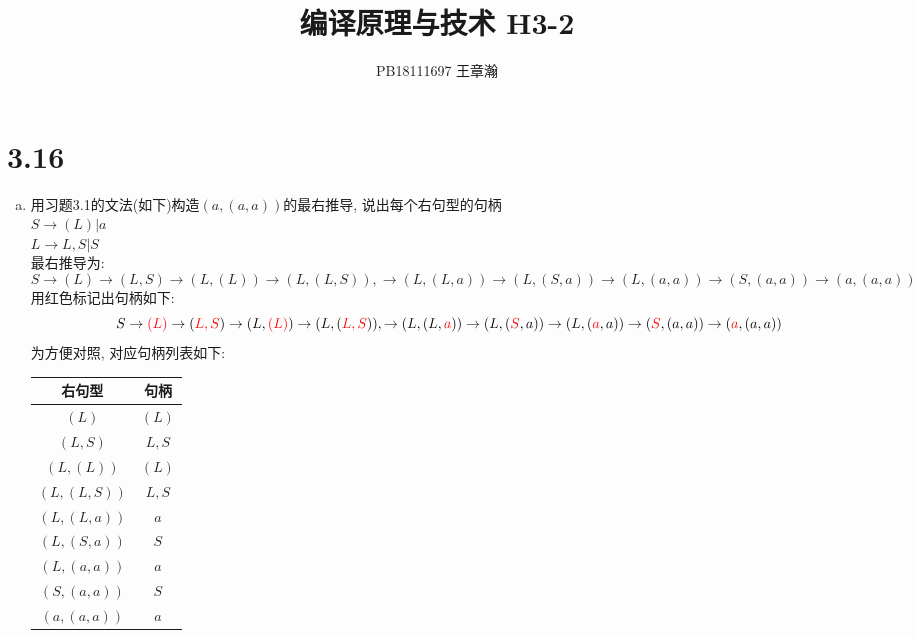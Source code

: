 \documentclass[UTF8]{article}
\title{编译原理与技术 H3-2}
\date{}
\author{PB18111697 王章瀚}
\newcommand{\red}[1]{\textcolor{red}{#1}}
\begin{document}
\maketitle
\section*{3.16}

\begin{enumerate}[(a) ]
\item 用习题3.1的文法(如下)构造$(a, (a, a))$的最右推导, 说出每个右句型的句柄\\
$S\rightarrow (L)|a$\\$L\rightarrow L,S|S$\\
	最右推导为: $$S\rightarrow(L)\rightarrow(L,S)\rightarrow(L,(L))\rightarrow(L,(L,S)),\rightarrow(L,(L,a))\rightarrow(L,(S,a))\rightarrow(L,(a,a))\rightarrow(S,(a,a))\rightarrow(a,(a,a))$$
	用红色标记出句柄如下:
	$$S\rightarrow\red{(L)}\rightarrow(\red{L,S})\rightarrow(L,\red{(L)})\rightarrow(L,(\red{L,S})),\rightarrow(L,(L,\red{a}))\rightarrow(L,(\red{S},a))\rightarrow(L,(\red{a},a))\rightarrow(\red{S},(a,a))\rightarrow(\red{a},(a,a))$$
	为方便对照, 对应句柄列表如下:\\
	\begin{tabular}{|c|c|}
	\hline
	右句型 & 句柄 \\
	\hline
	$(L)$ & $(L)$ \\
	\hline
	$(L,S)$ & $L,S$ \\
	\hline
	$(L,(L))$ & $(L)$ \\
	\hline
	$(L,(L,S))$ & $L,S$ \\
	\hline
	$(L,(L,a))$ & $a$ \\
	\hline
	$(L,(S,a))$ & $S$ \\
	\hline
	$(L,(a,a))$ & $a$ \\
	\hline
	$(S,(a,a))$ & $S$ \\
	\hline
	$(a,(a,a))$ & $a$ \\
	\hline
	\end{tabular}
	

\end{enumerate}
\end{document}
